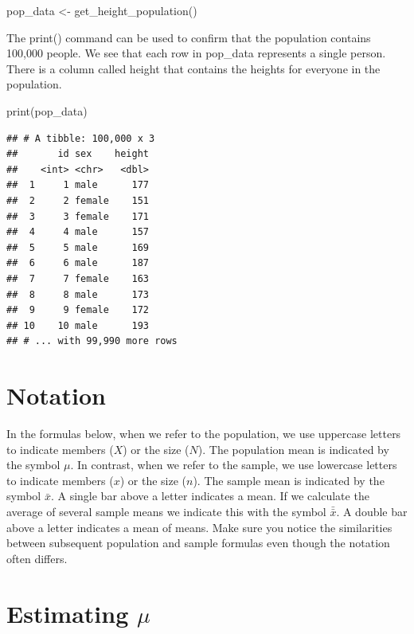 \documentclass[
]{krantz}
\makeatletter
\newenvironment{Shaded}{\begin{snugshade}}{\end{snugshade}}
\newcommand{\FunctionTok}[1]{\textcolor[rgb]{0,0,0}{#1}}
\newcommand{\NormalTok}[1]{#1}
\newcommand{\OtherTok}[1]{\textcolor[rgb]{0.37,0.37,0.37}{#1}}
\newenvironment{kframe}{%
\medskip{}
\setlength{\fboxsep}{.8em}
 \def\at@end@of@kframe{}%
 \ifinner\ifhmode%
  \def\at@end@of@kframe{\end{minipage}}%
  \begin{minipage}{\columnwidth}%
 \fi\fi%
 \def\FrameCommand##1{\hskip\@totalleftmargin \hskip-\fboxsep
 \colorbox{shadecolor}{##1}\hskip-\fboxsep
     \hskip-\linewidth \hskip-\@totalleftmargin \hskip\columnwidth}%
 \MakeFramed {\advance\hsize-\width
   \@totalleftmargin\z@ \linewidth\hsize
   \@setminipage}}%
 {\par\unskip\endMakeFramed%
 \at@end@of@kframe}
\renewenvironment{Shaded}{\begin{kframe}}{\end{kframe}}
\makeatother
\begin{document}
\begin{Shaded}
\begin{Highlighting}[]
\NormalTok{pop\_data }\OtherTok{\textless{}{-}} \FunctionTok{get\_height\_population}\NormalTok{() }
\end{Highlighting}
\end{Shaded}

The print() command can be used to confirm that the population contains 100,000 people. We see that each row in pop\_data represents a single person. There is a column called height that contains the heights for everyone in the population.

\begin{Shaded}
\begin{Highlighting}[]
\FunctionTok{print}\NormalTok{(pop\_data)}
\end{Highlighting}
\end{Shaded}

\begin{verbatim}
## # A tibble: 100,000 x 3
##       id sex    height
##    <int> <chr>   <dbl>
##  1     1 male      177
##  2     2 female    151
##  3     3 female    171
##  4     4 male      157
##  5     5 male      169
##  6     6 male      187
##  7     7 female    163
##  8     8 male      173
##  9     9 female    172
## 10    10 male      193
## # ... with 99,990 more rows
\end{verbatim}

\hypertarget{notation-1}{%
\section{Notation}\label{notation-1}}

In the formulas below, when we refer to the population, we use uppercase letters to indicate members (\(X\)) or the size (\(N\)). The population mean is indicated by the symbol \(\mu\). In contrast, when we refer to the sample, we use lowercase letters to indicate members (\(x\)) or the size (\(n\)). The sample mean is indicated by the symbol \(\bar{x}\). A single bar above a letter indicates a mean. If we calculate the average of several sample means we indicate this with the symbol \(\bar{\bar{x}}\). A double bar above a letter indicates a mean of means. Make sure you notice the similarities between subsequent population and sample formulas even though the notation often differs.

\hypertarget{estimating-mu}{%
\section{\texorpdfstring{Estimating \(\mu\)}{Estimating \textbackslash mu}}\label{estimating-mu}}
\end{document}
